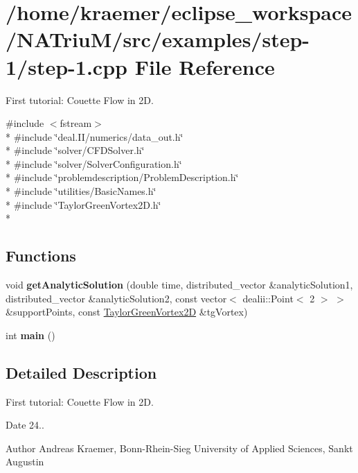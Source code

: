 \hypertarget{step-1_8cpp}{\section{/home/kraemer/eclipse\-\_\-workspace/\-N\-A\-Triu\-M/src/examples/step-\/1/step-\/1.cpp File Reference}
\label{step-1_8cpp}
}


First tutorial\-: Couette Flow in 2\-D.  


{\ttfamily \#include $<$fstream$>$}\\*
{\ttfamily \#include \char`\"{}deal.\-I\-I/numerics/data\-\_\-out.\-h\char`\"{}}\\*
{\ttfamily \#include \char`\"{}solver/\-C\-F\-D\-Solver.\-h\char`\"{}}\\*
{\ttfamily \#include \char`\"{}solver/\-Solver\-Configuration.\-h\char`\"{}}\\*
{\ttfamily \#include \char`\"{}problemdescription/\-Problem\-Description.\-h\char`\"{}}\\*
{\ttfamily \#include \char`\"{}utilities/\-Basic\-Names.\-h\char`\"{}}\\*
{\ttfamily \#include \char`\"{}Taylor\-Green\-Vortex2\-D.\-h\char`\"{}}\\*
\subsection*{Functions}
\begin{DoxyCompactItemize}
\item 
\hypertarget{step-1_8cpp_a775bad3411ff74d8d2c1eda1bf4a518a}{void {\bfseries get\-Analytic\-Solution} (double time, distributed\-\_\-vector \&analytic\-Solution1, distributed\-\_\-vector \&analytic\-Solution2, const vector$<$ dealii\-::\-Point$<$ 2 $>$ $>$ \&support\-Points, const \hyperlink{classnatrium_1_1TaylorGreenVortex2D}{Taylor\-Green\-Vortex2\-D} \&tg\-Vortex)}\label{step-1_8cpp_a775bad3411ff74d8d2c1eda1bf4a518a}

\item 
\hypertarget{step-1_8cpp_ae66f6b31b5ad750f1fe042a706a4e3d4}{int {\bfseries main} ()}\label{step-1_8cpp_ae66f6b31b5ad750f1fe042a706a4e3d4}

\end{DoxyCompactItemize}


\subsection{Detailed Description}
First tutorial\-: Couette Flow in 2\-D. \begin{DoxyDate}{Date}
24.. 
\end{DoxyDate}
\begin{DoxyAuthor}{Author}
Andreas Kraemer, Bonn-\/\-Rhein-\/\-Sieg University of Applied Sciences, Sankt Augustin 
\end{DoxyAuthor}
